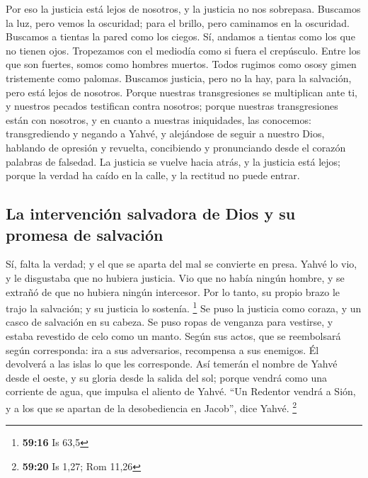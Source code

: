  Por eso la justicia está lejos de nosotros, y la justicia
no nos sobrepasa. Buscamos la luz, pero vemos la oscuridad; para el
brillo, pero caminamos en la oscuridad.  Buscamos a
tientas la pared como los ciegos. Sí, andamos a tientas como los que no
tienen ojos. Tropezamos con el mediodía como si fuera el crepúsculo.
Entre los que son fuertes, somos como hombres muertos. 
Todos rugimos como ososy gimen tristemente como palomas. Buscamos
justicia, pero no la hay, para la salvación, pero está lejos de
nosotros.  Porque nuestras transgresiones se multiplican
ante ti, y nuestros pecados testifican contra nosotros; porque nuestras
transgresiones están con nosotros, y en cuanto a nuestras iniquidades,
las conocemos:  transgrediendo y negando a Yahvé, y
alejándose de seguir a nuestro Dios, hablando de opresión y revuelta,
concibiendo y pronunciando desde el corazón palabras de falsedad.
 La justicia se vuelve hacia atrás, y la justicia está
lejos; porque la verdad ha caído en la calle, y la rectitud no puede
entrar.

\hypertarget{la-intervenciuxf3n-salvadora-de-dios-y-su-promesa-de-salvaciuxf3n}{%
\subsection{La intervención salvadora de Dios y su promesa de
salvación}\label{la-intervenciuxf3n-salvadora-de-dios-y-su-promesa-de-salvaciuxf3n}}

 Sí, falta la verdad; y el que se aparta del mal se
convierte en presa. Yahvé lo vio, y le disgustaba que no hubiera
justicia.  Vio que no había ningún hombre, y se extrañó
de que no hubiera ningún intercesor. Por lo tanto, su propio brazo le
trajo la salvación; y su justicia lo sostenía. \footnote{\textbf{59:16}
  Is 63,5}  Se puso la justicia como coraza, y un casco
de salvación en su cabeza. Se puso ropas de venganza para vestirse, y
estaba revestido de celo como un manto.  Según sus actos,
que se reembolsará según corresponda: ira a sus adversarios, recompensa
a sus enemigos. Él devolverá a las islas lo que les corresponde.
 Así temerán el nombre de Yahvé desde el oeste, y su
gloria desde la salida del sol; porque vendrá como una corriente de
agua, que impulsa el aliento de Yahvé.  ``Un Redentor
vendrá a Sión, y a los que se apartan de la desobediencia en Jacob'',
dice Yahvé. \footnote{\textbf{59:20} Is 1,27; Rom 11,26}

